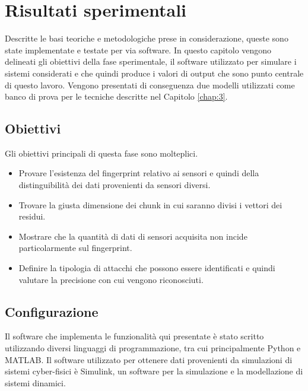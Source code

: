 \documentclass[Lau,binding=0.6cm]{sapthesis}
\begin{document}

\chapter{Risultati sperimentali}\label{chap:5}
Descritte le basi teoriche e metodologiche prese in considerazione, queste sono state implementate e testate per via software.
In questo capitolo vengono delineati gli obiettivi della fase sperimentale, il software utilizzato per simulare i sistemi considerati e che quindi produce i valori di output 
che sono punto centrale di questo lavoro. Vengono presentati di conseguenza due modelli utilizzati come banco di prova per le tecniche descritte nel Capitolo \ref{chap:3}.

\section{Obiettivi}
Gli obiettivi principali di questa fase sono molteplici.
\begin{itemize}
    \item Provare l'esistenza del fingerprint relativo ai sensori e quindi della distinguibilit\`a dei dati provenienti da sensori diversi.
    \item Trovare la giusta dimensione dei chunk in cui saranno divisi i vettori dei residui.
    \item Mostrare che la quantit\`a di dati di sensori acquisita non incide particolarmente sul fingerprint.
    \item Definire la tipologia di attacchi che possono essere identificati e quindi valutare la precisione con cui vengono riconosciuti.
 \end{itemize}

\section{Configurazione}
Il software che implementa le funzionalit\`a qui presentate \`e stato scritto utilizzando diversi linguaggi di programmazione, tra cui principalmente Python e MATLAB.
Il software utilizzato per ottenere dati provenienti da simulazioni di sistemi cyber-fisici \`e Simulink, un software per la simulazione e la modellazione di sistemi dinamici.
\end{document}
